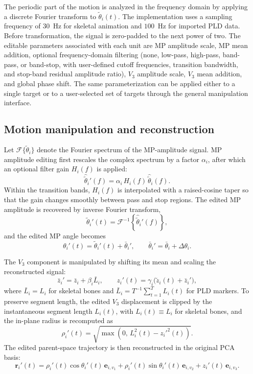 The periodic part of the motion is analyzed in the frequency domain by applying a discrete Fourier transform to $\tilde{\theta}_i(t)$. The implementation uses a sampling frequency of $30$~Hz for skeletal animation and $100$~Hz for imported PLD data. Before transformation, the signal is zero-padded to the next power of two. The editable parameters associated with each unit are MP amplitude scale, MP mean addition, optional frequency-domain filtering (none, low-pass, high-pass, band-pass, or band-stop, with user-defined cutoff frequencies, transition bandwidth, and stop-band residual amplitude ratio), $V_3$ amplitude scale, $V_3$ mean addition, and global phase shift. The same parameterization can be applied either to a single target or to a user-selected set of targets through the general manipulation interface.

\subsection{Motion manipulation and reconstruction}\label{subsec:methods-reconstruction}
Let $\mathcal{F}\{\tilde{\theta}_i\}$ denote the Fourier spectrum of the MP-amplitude signal. MP amplitude editing first rescales the complex spectrum by a factor $\alpha_i$, after which an optional filter gain $H_i(f)$ is applied:
\begin{equation}
\hat{\tilde{\theta}}_i'(f)=\alpha_i\,H_i(f)\,\hat{\tilde{\theta}}_i(f).
\end{equation}
Within the transition bands, $H_i(f)$ is interpolated with a raised-cosine taper so that the gain changes smoothly between pass and stop regions. The edited MP amplitude is recovered by inverse Fourier transform,
\begin{equation}
\tilde{\theta}_i'(t)=\mathcal{F}^{-1}\!\left\{\hat{\tilde{\theta}}_i'(f)\right\},
\end{equation}
and the edited MP angle becomes
\begin{equation}
\theta_i'(t)=\tilde{\theta}_i'(t)+\bar{\theta}_i', \qquad
\bar{\theta}_i'=\bar{\theta}_i+\Delta\theta_i.
\end{equation}

The $V_3$ component is manipulated by shifting its mean and scaling the reconstructed signal:
\begin{equation}
\bar{z}_i'=\bar{z}_i+\beta_i\bar{L}_i, \qquad
z_i'(t)=\gamma_i\bigl(\tilde{z}_i(t)+\bar{z}_i'\bigr),
\end{equation}
where $\bar{L}_i=L_i$ for skeletal bones and $\bar{L}_i=T^{-1}\sum_{t=1}^{T}L_i(t)$ for PLD markers. To preserve segment length, the edited $V_3$ displacement is clipped by the instantaneous segment length $L_i(t)$, with $L_i(t)\equiv L_i$ for skeletal bones, and the in-plane radius is recomputed as
\begin{equation}
\rho_i'(t)=\sqrt{\max\!\left(0,\,L_i^2(t)-z_i'^2(t)\right)}.
\end{equation}
The edited parent-space trajectory is then reconstructed in the original PCA basis:
\begin{equation}
\mathbf{r}_i'(t)=
\rho_i'(t)\cos\theta_i'(t)\,\mathbf{e}_{i,v_1}+
\rho_i'(t)\sin\theta_i'(t)\,\mathbf{e}_{i,v_2}+
z_i'(t)\,\mathbf{e}_{i,v_3}.
\end{equation}

